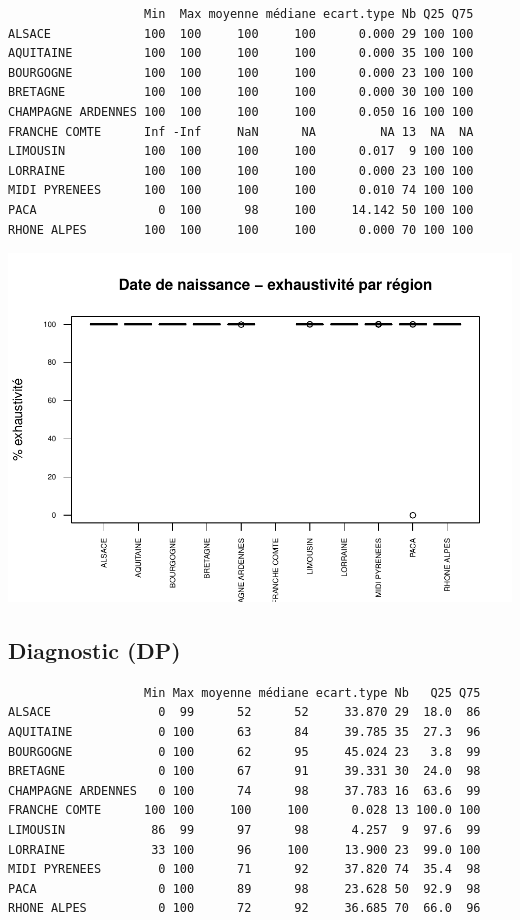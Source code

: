\documentclass[]{article}
\begin{document}
\begin{verbatim}
                   Min  Max moyenne médiane ecart.type Nb Q25 Q75
ALSACE             100  100     100     100      0.000 29 100 100
AQUITAINE          100  100     100     100      0.000 35 100 100
BOURGOGNE          100  100     100     100      0.000 23 100 100
BRETAGNE           100  100     100     100      0.000 30 100 100
CHAMPAGNE ARDENNES 100  100     100     100      0.050 16 100 100
FRANCHE COMTE      Inf -Inf     NaN      NA         NA 13  NA  NA
LIMOUSIN           100  100     100     100      0.017  9 100 100
LORRAINE           100  100     100     100      0.000 23 100 100
MIDI PYRENEES      100  100     100     100      0.010 74 100 100
PACA                 0  100      98     100     14.142 50 100 100
RHONE ALPES        100  100     100     100      0.000 70 100 100
\end{verbatim}

\includegraphics{septembre2015_files/figure-latex/unnamed-chunk-35-1.pdf}

\subsection{Diagnostic (DP)}\label{diagnostic-dp-2}

\begin{verbatim}
                   Min Max moyenne médiane ecart.type Nb   Q25 Q75
ALSACE               0  99      52      52     33.870 29  18.0  86
AQUITAINE            0 100      63      84     39.785 35  27.3  96
BOURGOGNE            0 100      62      95     45.024 23   3.8  99
BRETAGNE             0 100      67      91     39.331 30  24.0  98
CHAMPAGNE ARDENNES   0 100      74      98     37.783 16  63.6  99
FRANCHE COMTE      100 100     100     100      0.028 13 100.0 100
LIMOUSIN            86  99      97      98      4.257  9  97.6  99
LORRAINE            33 100      96     100     13.900 23  99.0 100
MIDI PYRENEES        0 100      71      92     37.820 74  35.4  98
PACA                 0 100      89      98     23.628 50  92.9  98
RHONE ALPES          0 100      72      92     36.685 70  66.0  96
\end{verbatim}
\end{document}
